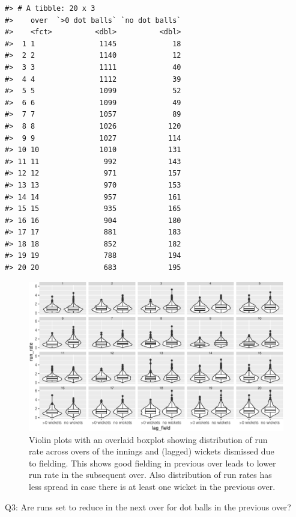 \documentclass[12pt]{article}
\begin{document}
\begin{verbatim}
#> # A tibble: 20 x 3
#>    over  `>0 dot balls` `no dot balls`
#>    <fct>          <dbl>          <dbl>
#>  1 1               1145             18
#>  2 2               1140             12
#>  3 3               1111             40
#>  4 4               1112             39
#>  5 5               1099             52
#>  6 6               1099             49
#>  7 7               1057             89
#>  8 8               1026            120
#>  9 9               1027            114
#> 10 10              1010            131
#> 11 11               992            143
#> 12 12               971            157
#> 13 13               970            153
#> 14 14               957            161
#> 15 15               935            165
#> 16 16               904            180
#> 17 17               881            183
#> 18 18               852            182
#> 19 19               788            194
#> 20 20               683            195
\end{verbatim}

\begin{figure}

{\centering \includegraphics[width=\textwidth]{figure/field-1} 

}

\caption{Violin plots with an overlaid boxplot showing distribution of run rate across overs of the innings and (lagged) wickets dismissed due to fielding. This shows good fielding in previous over leads to lower run rate in the subsequent over. Also distribution of run rates has less spread in case there is at least one wicket in the previous over.}\label{fig:field}
\end{figure}

Q3: Are runs set to reduce in the next over for dot balls in the previous over?
\end{document}
